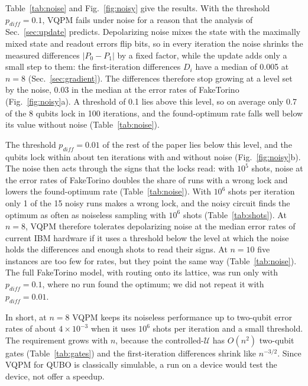 \documentclass[onecolumn,10pt]{article}
\theoremstyle{remark}
\theoremstyle{plain}
\begin{document}
Table~\ref{tab:noise} and Fig.~\ref{fig:noisy} give the results. With the threshold $p_{diff}=0.1$, VQPM fails under noise for a reason that the analysis of Sec.~\ref{sec:update} predicts. Depolarizing noise mixes the state with the maximally mixed state and readout errors flip bits, so in every iteration the noise shrinks the measured differences $|P_0-P_1|$ by a fixed factor, while the update adds only a small step to them: the first-iteration differences $D_i$ have a median of 0.005 at $n=8$ (Sec.~\ref{sec:gradient}). The differences therefore stop growing at a level set by the noise, 0.03 in the median at the error rates of FakeTorino (Fig.~\ref{fig:noisy}a). A threshold of 0.1 lies above this level, so on average only 0.7 of the 8 qubits lock in 100 iterations, and the found-optimum rate falls well below its value without noise (Table~\ref{tab:noise}).

The threshold $p_{diff}=0.01$ of the rest of the paper lies below this level, and the qubits lock within about ten iterations with and without noise (Fig.~\ref{fig:noisy}b). The noise then acts through the signs that the locks read: with $10^5$ shots, noise at the error rates of FakeTorino doubles the share of runs with a wrong lock and lowers the found-optimum rate (Table~\ref{tab:noise}). With $10^6$ shots per iteration only 1 of the 15 noisy runs makes a wrong lock, and the noisy circuit finds the optimum as often as noiseless sampling with $10^6$ shots (Table~\ref{tab:shots}). At $n=8$, VQPM therefore tolerates depolarizing noise at the median error rates of current IBM hardware if it uses a threshold below the level at which the noise holds the differences and enough shots to read their signs. At $n=10$ five instances are too few for rates, but they point the same way (Table~\ref{tab:noise}). The full FakeTorino model, with routing onto its lattice, was run only with $p_{diff}=0.1$, where no run found the optimum; we did not repeat it with $p_{diff}=0.01$.

In short, at $n=8$ VQPM keeps its noiseless performance up to two-qubit error rates of about $4\times10^{-3}$ when it uses $10^6$ shots per iteration and a small threshold. The requirement grows with $n$, because the controlled-$\mathcal U$ has $O(n^2)$ two-qubit gates (Table~\ref{tab:gates}) and the first-iteration differences shrink like $n^{-3/2}$. Since VQPM for QUBO is classically simulable, a run on a device would test the device, not offer a speedup.
\end{document}
